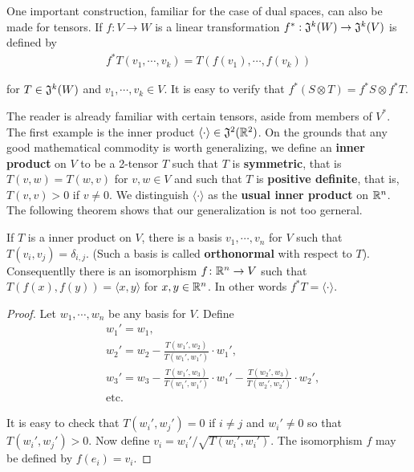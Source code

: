One important construction, familiar for the case of dual
spaces, can also be made for tensors. If $f\colon{}V\to W$ is a 
linear transformation $f^*:\mathfrak{J}^k(W) \to \mathfrak{J}^k(V)$ is defined 
by 
\begin{align*}
    f^*T(v_1, \cdots, v_k) = T(f(v_1), \cdots, f(v_k))
\end{align*}

for $T\in \mathfrak{J}^k(W)$ and $v_1, \cdots, v_k\in V$. It is easy to 
verify that $f^*(S\otimes T) = f^*S\otimes f^*T$.

The reader is already familiar with certain tensors, aside
from members of $V^*$. The first example is the inner product
$\langle\cdot \rangle\in \mathfrak{J}^2(\mathbb{R}^2)$. 
On the grounds that any good mathematical commodity is worth generalizing, 
we define an \textbf{inner product} on $V$ to be a 2-tensor $T$ such that $T$
is \textbf{symmetric}, that is $T(v, w) = T(w, v)$ for $v, w\in V$ and such that 
$T$ is \textbf{positive definite}, that is, $T(v, v)>0$ if $v\neq 0$. We distinguish
$\langle \cdot \rangle$ as the \textbf{usual inner product} on $\mathbb{R}^n$. The following 
theorem shows that our generalization is not too gerneral. 

\begin{theorem}
    If $T$ is a inner product on $V$, there is a basis $v_1, \cdots, v_n$ for $V$ such that 
    $T(v_i, v_j) =\delta_{i,j}$. (Such a basis is called \textbf{orthonormal} with respect to $T$).
    Consequentlly there is an isomorphism $f\colon{}\mathbb{R}^n\to V$ such that $T(f(x), f(y)) = \langle x, y\rangle$
    for $x, y\in \mathbb{R}^n$. In other words $f^*T = \langle \cdot\rangle$.
\end{theorem}

\begin{proof}
    Let $w_1, \cdots, w_n$ be any basis for $V$. Define 
    \begin{align*}
        & w_1' = w_1, \\
        & w_2' = w_2 - \frac{T(w_1', w_2)}{T(w_1', w_1')}\cdot w_1',\\
        & w_3' = w_3 - \frac{T(w_1', w_3)}{T(w_1', w_1')}\cdot w_1' 
            - \frac{T(w_2', w_3)}{T(w_2', w_2')}\cdot w_2',\\
        & \text{etc.}
    \end{align*}

    It is easy to check that $T(w_i', w_j') =0$ if $i\neq j$ and $w_i'\neq 0$ so that 
    $T(w_i', w_j') >0$. Now define $v_i = w_i'\big/\sqrt{T(w_i', w_i')}$. The isomorphism
    $f$ may be defined by $f(e_i) = v_i$.
\end{proof}

